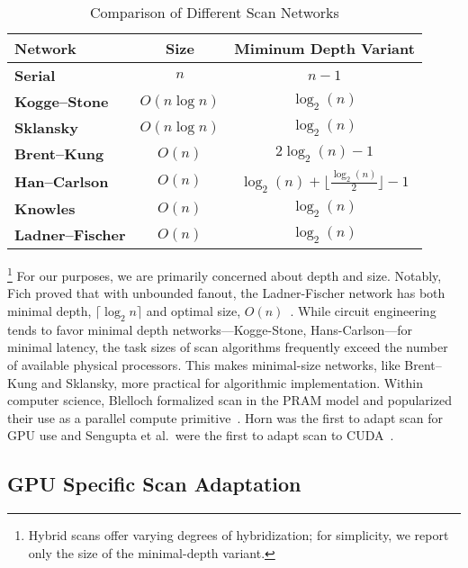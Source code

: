 \documentclass[sigconf]{acmart}
\begin{document}
\begin{table}[h]
  \centering
  \caption{Comparison of Different Scan Networks}
  \label{tab:scan_comparison_exact}
  \begin{tabular}{lcc}
    \toprule
    \textbf{Network}         & \textbf{Size} & \textbf{Miminum Depth Variant}                                 \\ \midrule
    \textbf{Serial}          & $n$           & $n - 1$                                                        \\
    \textbf{Kogge--Stone}    & $O(n \log n)$ & $\log_2(n)$                                                    \\
    \textbf{Sklansky}        & $O(n \log n)$ & $\log_2(n)$                                                    \\
    \textbf{Brent--Kung}     & $O(n)$        & $2 \log_2(n) - 1$                                              \\
    \textbf{Han--Carlson}    & $O(n)$        & $\log_2(n) + \Big\lfloor \tfrac{\log_2(n)}{2} \Big\rfloor - 1$ \\
    \textbf{Knowles}         & $O(n)$        & $\log_2(n)$                                                    \\
    \textbf{Ladner--Fischer} & $O(n)$        & $\log_2(n)$                                                    \\ \bottomrule
  \end{tabular}
\end{table}
\footnote{Hybrid scans offer varying degrees of hybridization; for simplicity, we report only the size of the minimal-depth variant.}
For our purposes, we are primarily concerned about depth and size. Notably, Fich proved that with unbounded fanout, the Ladner-Fischer network has both minimal depth, $\lceil \log_2n \rceil$ and optimal size, $O(n)$~\cite{}. While circuit engineering tends to favor minimal depth networks---Kogge-Stone, Hans-Carlson---for minimal latency, the task sizes of scan algorithms frequently exceed the number of available physical processors. This makes minimal-size networks, like Brent–Kung and Sklansky, more practical for algorithmic implementation. Within computer science, Blelloch formalized scan in the PRAM model and popularized their use as a parallel compute primitive~\cite{}. Horn was the first to adapt scan for GPU use and Sengupta et al.\ were the first to adapt scan to CUDA~\cite{}.

\subsection{GPU Specific Scan Adaptation}
\end{document}
